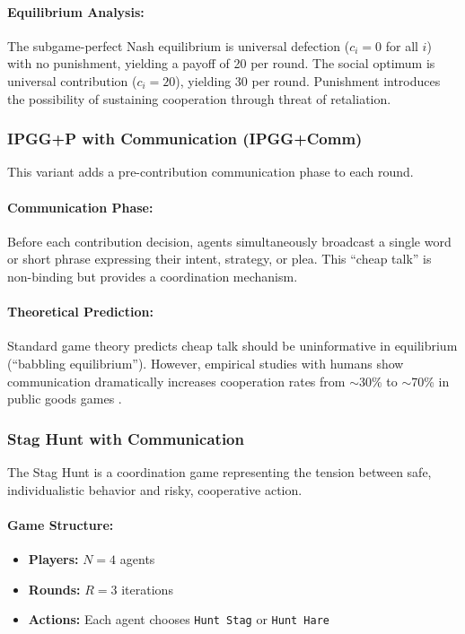\paragraph{Equilibrium Analysis:}
The subgame-perfect Nash equilibrium is universal defection ($c_i = 0$ for all $i$) with no punishment, yielding a payoff of 20 per round. The social optimum is universal contribution ($c_i = 20$), yielding 30 per round. Punishment introduces the possibility of sustaining cooperation through threat of retaliation.

\subsubsection{IPGG+P with Communication (IPGG+Comm)}

This variant adds a pre-contribution communication phase to each round.

\paragraph{Communication Phase:}
Before each contribution decision, agents simultaneously broadcast a single word or short phrase expressing their intent, strategy, or plea. This ``cheap talk'' is non-binding but provides a coordination mechanism.

\paragraph{Theoretical Prediction:}
Standard game theory predicts cheap talk should be uninformative in equilibrium (``babbling equilibrium''). However, empirical studies with humans show communication dramatically increases cooperation rates from $\sim$30\% to $\sim$70\% in public goods games \citep{sally1995conversation, bochet2006communication}.

\subsubsection{Stag Hunt with Communication}

The Stag Hunt is a coordination game representing the tension between safe, individualistic behavior and risky, cooperative action.

\paragraph{Game Structure:}
\begin{itemize}
    \item \textbf{Players:} $N = 4$ agents
    \item \textbf{Rounds:} $R = 3$ iterations
    \item \textbf{Actions:} Each agent chooses \texttt{Hunt Stag} or \texttt{Hunt Hare}
\end{itemize}

